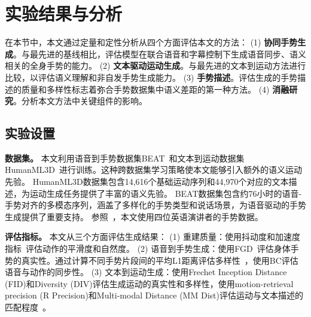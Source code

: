 

\section{实验结果与分析}
\label{sec:experiments}
在本节中，本文通过定量和定性分析从四个方面评估本文的方法：
(1) \textbf{协同手势生成}。与最先进的基线相比，评估模型在联合语音和字幕控制下生成语音同步、语义相关的全身手势的能力。
(2) \textbf{文本驱动运动生成}。与最先进的文本到运动方法进行比较，以评估语义理解和非自发手势生成能力。
(3) \textbf{手势描述}。评估生成的手势描述的质量和多样性标志着弥合手势数据集中语义差距的第一种方法。
(4) \textbf{消融研究}。分析本文方法中关键组件的影响。

\subsection{实验设置}
\textbf{数据集。}
本文利用语音到手势数据集BEAT~\cite{liu2022beat}和文本到运动数据集HumanML3D~\cite{guo2022humanml3d}进行训练。这种跨数据集学习策略使本文能够引入额外的语义运动先验。
HumanML3D数据集包含14,616个基础运动序列和44,970个对应的文本描述，为运动生成任务提供了丰富的语义先验。
BEAT数据集包含约76小时的语音-手势对齐的多模态序列，涵盖了多样化的手势类型和说话场景，为语音驱动的手势生成提供了重要支持。
参照~\cite{liu2022beat}，本文使用四位英语演讲者的手势数据。

\textbf{评估指标。}
本文从三个方面评估生成结果：
(1) 重建质量：使用抖动度和加速度指标~\cite{kucherenko2019analyzing}评估动作的平滑度和自然度。
(2) 语音到手势生成：使用FGD~\cite{yoon2020speech}评估身体手势的真实性。通过计算不同手势片段间的平均L1距离评估多样性~\cite{liu2024emage}，使用BC评估语音与动作的同步性。
(3) 文本到运动生成：使用Frechet Inception Distance (FID)和Diversity (DIV)评估生成运动的真实性和多样性，使用motion-retrieval precision (R Precision)和Multi-modal Distance (MM Dist)评估运动与文本描述的匹配程度~\cite{chen2023executing}。

